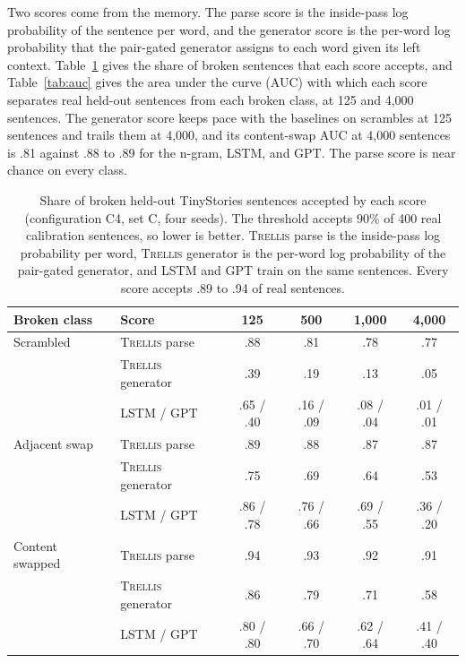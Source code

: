 \documentclass[11pt,letterpaper]{article}
\newcommand{\trellis}{\textsc{Trellis}}
\begin{document}
Two scores come from the memory. The parse score is the inside-pass log probability of the sentence per word, and the generator score is the per-word log probability that the pair-gated generator assigns to each word given its left context.
Table~\ref{tab:parse} gives the share of broken sentences that each score accepts, and Table~\ref{tab:auc} gives the area under the curve (AUC) with which each score separates real held-out sentences from each broken class, at 125 and 4,000 sentences.
The generator score keeps pace with the baselines on scrambles at 125 sentences and trails them at 4,000, and its content-swap AUC at 4,000 sentences is .81 against .88 to .89 for the n-gram, LSTM, and GPT. The parse score is near chance on every class.

\begin{table}[h]
\caption{Share of broken held-out TinyStories sentences accepted by each score (configuration C4, set C, four seeds). The threshold accepts 90\% of 400 real calibration sentences, so lower is better.
\trellis{} parse is the inside-pass log probability per word, \trellis{} generator is the per-word log probability of the pair-gated generator, and LSTM and GPT train on the same sentences.
Every score accepts .89 to .94 of real sentences.}
\label{tab:parse}
\begin{center}
\small
\begin{tabular}{llcccc}
\toprule
Broken class & Score & 125 & 500 & 1,000 & 4,000 \\
\midrule
Scrambled & \trellis{} parse & .88 & .81 & .78 & .77 \\
 & \trellis{} generator & .39 & .19 & .13 & .05 \\
 & LSTM / GPT & .65 / .40 & .16 / .09 & .08 / .04 & .01 / .01 \\
Adjacent swap & \trellis{} parse & .89 & .88 & .87 & .87 \\
 & \trellis{} generator & .75 & .69 & .64 & .53 \\
 & LSTM / GPT & .86 / .78 & .76 / .66 & .69 / .55 & .36 / .20 \\
Content swapped & \trellis{} parse & .94 & .93 & .92 & .91 \\
 & \trellis{} generator & .86 & .79 & .71 & .58 \\
 & LSTM / GPT & .80 / .80 & .66 / .70 & .62 / .64 & .41 / .40 \\
\bottomrule
\end{tabular}
\end{center}
\end{table}
\end{document}
